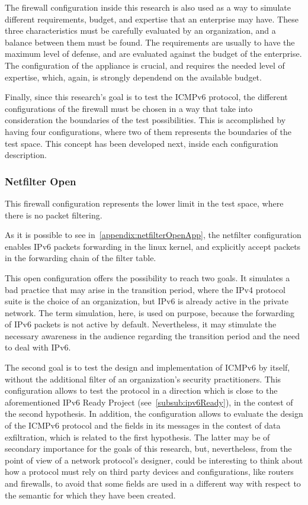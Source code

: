 \documentclass[12pt]{article}
\begin{document}
The firewall configuration inside this research is also used as a way to simulate different requirements, budget, and expertise that an enterprise may have. These three characteristics must be carefully evaluated by an organization, and a balance between them must be found. The requirements are usually to have the maximum level of defense, and are evaluated against the budget of the enterprise. The configuration of the appliance is crucial, and requires the needed level of expertise, which, again, is strongly dependend on the available budget.

Finally, since this research's goal is to test the ICMPv6 protocol, the different configurations of the firewall must be chosen in a way that take into consideration the boundaries of the test possibilities. This is accomplished by having four configurations, where two of them represents the boundaries of the test space. This concept has been developed next, inside each configuration description.

\subsubsection{Netfilter Open}
\label{subsub:netfilterOpen}

This firewall configuration represents the lower limit in the test space, where there is no packet filtering.

As it is possible to see in~\ref{appendix:netfilterOpenApp}, the netfilter configuration enables IPv6 packets forwarding in the linux kernel, and explicitly accept packets in the forwarding chain of the filter table.

This open configuration offers the possibility to reach two goals. It simulates a bad practice that may arise in the transition period, where the IPv4 protocol suite is the choice of an organization, but IPv6 is already active in the private network. The term simulation, here, is used on purpose, because the forwarding of IPv6 packets is not active by default. Nevertheless, it may stimulate the necessary awareness in the audience regarding the transition period and the need to deal with IPv6.

The second goal is to test the design and implementation of ICMPv6 by itself, without the additional filter of an organization's security practitioners. This configuration allows to test the protocol in a direction which is close to the aforementioned IPv6 Ready Project (see~\ref{subsub:ipv6Ready}), in the contest of the second hypothesis. In addition, the configuration allows to evaluate the design of the ICMPv6 protocol and the fields in its messages in the contest of data exfiltration, which is related to the first hypothesis. The latter may be of secondary importance for the goals of this research, but, nevertheless, from the point of view of a network protocol's designer, could be interesting to think about how a protocol must rely on third party devices and configurations, like routers and firewalls, to avoid that some fields are used in a different way with respect to the semantic for which they have been created.
\end{document}
